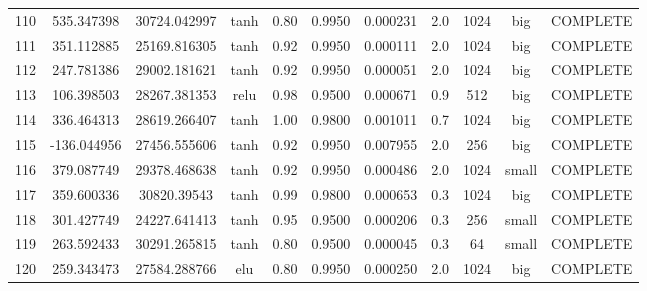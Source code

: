\begin{longtable}{ccccccccccc}
                      110 &                 535.347398 &                       30724.042997 &            tanh &        0.80 & 0.9950 &       0.000231 &             2.0 &     1024 &       big & COMPLETE \\
                      111 &                 351.112885 &                       25169.816305 &            tanh &        0.92 & 0.9950 &       0.000111 &             2.0 &     1024 &       big & COMPLETE \\
                      112 &                 247.781386 &                       29002.181621 &            tanh &        0.92 & 0.9950 &       0.000051 &             2.0 &     1024 &       big & COMPLETE \\
                      113 &                 106.398503 &                       28267.381353 &            relu &        0.98 & 0.9500 &       0.000671 &             0.9 &      512 &       big & COMPLETE \\
                      114 &                 336.464313 &                       28619.266407 &            tanh &        1.00 & 0.9800 &       0.001011 &             0.7 &     1024 &       big & COMPLETE \\
                      115 &                -136.044956 &                       27456.555606 &            tanh &        0.92 & 0.9950 &       0.007955 &             2.0 &      256 &       big & COMPLETE \\
                      116 &                 379.087749 &                       29378.468638 &            tanh &        0.92 & 0.9950 &       0.000486 &             2.0 &     1024 &     small & COMPLETE \\
                      117 &                 359.600336 &                        30820.39543 &            tanh &        0.99 & 0.9800 &       0.000653 &             0.3 &     1024 &       big & COMPLETE \\
                      118 &                 301.427749 &                       24227.641413 &            tanh &        0.95 & 0.9500 &       0.000206 &             0.3 &      256 &     small & COMPLETE \\
                      119 &                 263.592433 &                       30291.265815 &            tanh &        0.80 & 0.9500 &       0.000045 &             0.3 &       64 &     small & COMPLETE \\
                      120 &                 259.343473 &                       27584.288766 &             elu &        0.80 & 0.9950 &       0.000250 &             2.0 &     1024 &       big & COMPLETE \\

\end{longtable}
